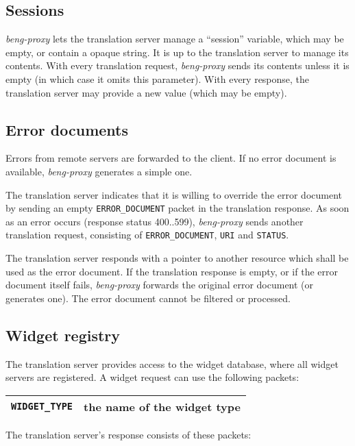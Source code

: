 \documentclass[a4paper,12pt]{article}
\begin{document}
\subsection{Sessions}
\label{sessions}

\emph{beng-proxy} lets the translation server manage a ``session''
variable, which may be empty, or contain a opaque string.  It is up to
the translation server to manage its contents.  With every translation
request, \emph{beng-proxy} sends its contents unless it is empty (in
which case it omits this parameter).  With every response, the
translation server may provide a new value (which may be empty).

\subsection{Error documents}
\label{errdoc}

Errors from remote servers are forwarded to the client.  If no error
document is available, \emph{beng-proxy} generates a simple one.

The translation server indicates that it is willing to override the
error document by sending an empty \verb|ERROR_DOCUMENT| packet in
the translation response.  As soon as an error occurs (response status
400..599), \emph{beng-proxy} sends another translation request,
consisting of \verb|ERROR_DOCUMENT|, \verb|URI| and
\verb|STATUS|.

The translation server responds with a pointer to another resource
which shall be used as the error document.  If the translation
response is empty, or if the error document itself fails,
\emph{beng-proxy} forwards the original error document (or generates
one).  The error document cannot be filtered or processed.

\subsection{Widget registry}
\label{registry}

The translation server provides access to the widget database, where
all widget servers are registered.  A widget request can use the
following packets:

\begin{longtable}{|l|p{10cm}|}
\hline
\verb|WIDGET_TYPE| & the name of the widget type \\
\hline
\end{longtable}

The translation server's response consists of these packets:
\end{document}
